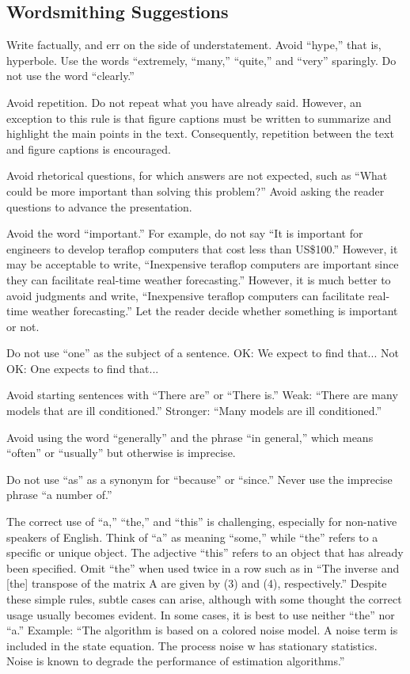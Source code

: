 \subsection{Wordsmithing Suggestions}

Write factually, and err on the side of understatement.  Avoid ``hype,'' that is, hyperbole.  Use the words ``extremely, ``many,'' ``quite,'' and ``very'' sparingly. Do not use the word ``clearly.''

Avoid repetition.  Do not repeat what you have already said.  However, an exception to this rule is that figure captions must be written to summarize and highlight the main points in the text.  Consequently, repetition between the text and figure captions is encouraged.

Avoid rhetorical questions, for which answers are not expected, such as ``What could be more important than solving this problem?'' Avoid asking the reader questions to advance the presentation.

Avoid the word ``important.'' For example, do not say ``It is important for engineers to develop teraflop computers that cost less than US\$100.''  However, it may be acceptable to write, ``Inexpensive teraflop computers are important since they can facilitate real-time weather forecasting.''  However, it is much better to avoid judgments and write, ``Inexpensive teraflop computers can facilitate real-time weather forecasting.''  Let the reader decide whether something is important or not.  

Do not use ``one'' as the subject of a sentence.  OK:  We expect to find that...  \newline 
Not OK:  One expects to find that... 

Avoid starting sentences with ``There are'' or ``There is.''  Weak:  ``There are many models that are ill conditioned.''  Stronger:  ``Many models are ill conditioned.''

Avoid using the word ``generally'' and the phrase ``in general,'' which means ``often'' or ``usually'' but otherwise is imprecise.

Do not use ``as'' as a synonym for ``because'' or ``since.'' Never use the imprecise phrase ``a number of.''

The correct use of ``a,'' “the,” and ``this'' is challenging, especially for non-native speakers of English.  Think of ``a'' as meaning ``some,'' while ``the'' refers to a specific or unique object.  The adjective ``this'' refers to an object that has already been specified.  Omit ``the'' when used twice in a row such as in ``The inverse and [the] transpose of the matrix A are given by (3) and (4), respectively.''  Despite these simple rules, subtle cases can arise, although with some thought the correct usage usually becomes evident.  In some cases, it is best to use neither ``the'' nor ``a.''  Example: ``The algorithm is based on a colored noise model.  A noise term is included in the state equation.  The process noise w has stationary statistics.  Noise is known to degrade the performance of estimation algorithms.'' 

